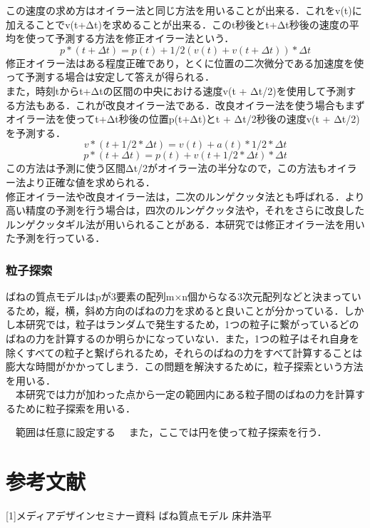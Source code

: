 \documentclass[11pt]{jreport}
\begin{document}
この速度の求め方はオイラー法と同じ方法を用いることが出来る．これをv(t)に加えることでv(t+Δt)を求めることが出来る．このt秒後とt+Δt秒後の速度の平均を使って予測する方法を修正オイラー法という．
\begin{equation} 
  p*(t + Δt) = p(t) + 1/2(v(t)+v(t+Δt)) * Δt \label{exp:sample}
\end{equation}
修正オイラー法はある程度正確であり，とくに位置の二次微分である加速度を使って予測する場合は安定して答えが得られる．\\
また，時刻tからt+Δtの区間の中央における速度v(t + Δt/2)を使用して予測する方法もある．これが改良オイラー法である．改良オイラー法を使う場合もまずオイラー法を使ってt+Δt秒後の位置p(t+Δt)とt + Δt/2秒後の速度v(t + Δt/2)を予測する．
\begin{equation}
  v*(t + 1/2*Δt) = v(t) + a(t) * 1/2*Δt \label{exp:sample}
\end{equation}
\begin{equation}
  p*(t + Δt) = p(t) + v(t+1/2 * Δt) * Δt \label{exp:sample}
\end{equation}
この方法は予測に使う区間Δt/2がオイラー法の半分なので，この方法もオイラー法より正確な値を求められる．\\
修正オイラー法や改良オイラー法は，二次のルンゲクッタ法とも呼ばれる．より高い精度の予測を行う場合は，四次のルンゲクッタ法や，それをさらに改良したルンゲクッタギル法が用いられることがある．本研究では修正オイラー法を用いた予測を行っている．

\subsection{粒子探索}
 ばねの質点モデルはpが3要素の配列m×n個からなる3次元配列などと決まっているため，縦，横，斜め方向のばねの力を求めると良いことが分かっている．しかし本研究では，粒子はランダムで発生するため，1つの粒子に繋がっているどのばねの力を計算するのか明らかになっていない．また，1つの粒子はそれ自身を除くすべての粒子と繋げられるため，それらのばねの力をすべて計算することは膨大な時間がかかってしまう．この問題を解決するために，粒子探索という方法を用いる．\\
　本研究では力が加わった点から一定の範囲内にある粒子間のばねの力を計算するために粒子探索を用いる．

　範囲は任意に設定する
　また，ここでは円を使って粒子探索を行う．

\chapter{参考文献}
[1]メディアデザインセミナー資料 ばね質点モデル 床井浩平
\end{document}
